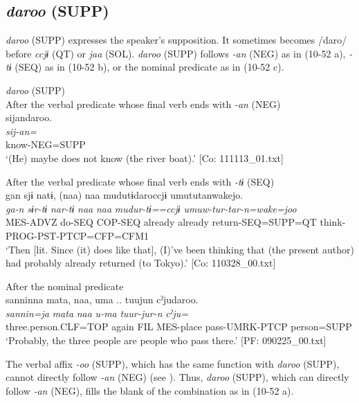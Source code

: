 \subsection{\textit{daroo} (SUPP)}\label{sec:10.3.7}

\textit{daroo} (SUPP) expresses the speaker’s supposition. It sometimes becomes /daro/ before \textit{ccjɨ} (QT) or \textit{jaa} (SOL). \textit{daroo} (SUPP) follows \textit{{}-an} (NEG) as in (10-52 a), \textit{{}-tɨ} (SEQ) as in (10-52 b), or the nominal predicate as in (10-52 c).

\ea\label{ex:10.52}   \textit{daroo} (SUPP)\\
  \ea After the verbal predicate whose final verb ends with \textit{{}-an} (NEG)\\
      \glll    sijandaroo.\\
    \textit{sij-an=}\\
    know-NEG=SUPP\\
\glt     ‘(He) maybe does not know (the river boat).’  [Co: 111113\_01.txt]

  \ex After the verbal predicate whose final verb ends with \textit{{}-tɨ} (SEQ)\\
      \glll    gan  sjɨ  natɨ,  (naa)  naa  mudutɨdaroccjɨ   umututanwakejo.\\
    \textit{ga-n}  \textit{sɨr-tɨ}  \textit{nar-tɨ}  \textit{naa}  \textit{naa}  \textit{mudur-tɨ==ccjɨ}   \textit{umuw-tur-tar-n=wake=joo}\\
    MES-ADVZ  do-SEQ  COP-SEQ  already  already  return-SEQ=SUPP=QT  think-PROG-PST-PTCP=CFP=CFM1\\
\glt     ‘Then [lit. Since (it) does like that], (I)’ve been thinking that (the present author) had probably already returned (to Tokyo).’  [Co: 110328\_00.txt]

  \ex After the nominal predicate\\
      \glll    {\textbar}sannin{\textbar}na  mata,  naa,  uma ..  tuujun  cˀjudaroo.\\
    \textit{sannin=ja}  \textit{mata}  \textit{naa}  \textit{u-ma}  \textit{tuur-jur-n} \textit{cˀju=}\\
    three.person.CLF=TOP  again  FIL  MES-place  pass-UMRK-PTCP  person=SUPP  \\
    \glt     ‘Probably, the three people are people who pass there.’   [PF: 090225\_00.txt]
\z
\z

The verbal affix \textit{{}-oo} (SUPP), which has the same function with \textit{daroo} (SUPP), cannot directly follow \textit{{}-an} (NEG) (see ). Thus, \textit{daroo} (SUPP), which can directly follow \textit{-an} (NEG), fills the blank of the combination as in (10-52 a).

